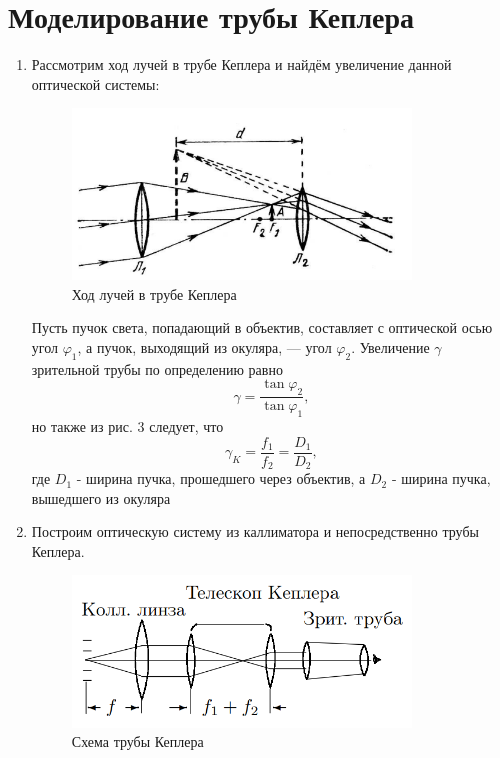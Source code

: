 \documentclass[a4paper]{article}
\begin{document}
\section{Моделирование трубы Кеплера}
\begin{enumerate}
    \item Рассмотрим ход лучей в трубе Кеплера и найдём увеличение данной оптической системы:
    
    \begin{figure}[h]
    \centering
    \includegraphics[width=9cm]{kepler.PNG}
    \caption{Ход лучей в трубе Кеплера}
    \label{fig:vac}
\end{figure}

Пусть пучок света, попадающий в объектив, составляет с оптической осью угол $\varphi_1$, а пучок, выходящий из окуляра, — угол $\varphi_2$. Увеличение $\gamma$ зрительной трубы по определению равно
\begin{equation}
    \gamma = \frac{\tan \varphi_2}{\tan \varphi_1},
\end{equation}
но также из рис. 3 следует, что 
\begin{equation}
    \gamma_K = \frac{f_1}{f_2} = \frac{D_1}{D_2},
\end{equation}
где $D_1$ - ширина пучка, прошедшего через объектив, а $D_2$ - ширина пучка, вышедшего из окуляра

\item Построим оптическую систему из каллиматора и непосредственно трубы Кеплера. 

    \begin{figure}[h]
    \centering
    \includegraphics[width=9cm]{kepler_2.PNG}
    \caption{Схема трубы Кеплера}
    \label{fig:vac}
\end{figure}


\end{enumerate}
\end{document}
